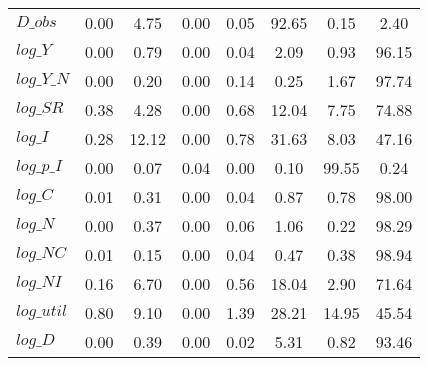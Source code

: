 \begin{center}
\begin{longtable}{lccccccc}
$D\_obs     $	 & 	        0.00	 & 	        4.75	 & 	        0.00	 & 	        0.05	 & 	       92.65	 & 	        0.15	 & 	        2.40 \\ 
$log\_Y     $	 & 	        0.00	 & 	        0.79	 & 	        0.00	 & 	        0.04	 & 	        2.09	 & 	        0.93	 & 	       96.15 \\ 
$log\_Y\_N  $	 & 	        0.00	 & 	        0.20	 & 	        0.00	 & 	        0.14	 & 	        0.25	 & 	        1.67	 & 	       97.74 \\ 
$log\_SR    $	 & 	        0.38	 & 	        4.28	 & 	        0.00	 & 	        0.68	 & 	       12.04	 & 	        7.75	 & 	       74.88 \\ 
$log\_I     $	 & 	        0.28	 & 	       12.12	 & 	        0.00	 & 	        0.78	 & 	       31.63	 & 	        8.03	 & 	       47.16 \\ 
$log\_p\_I  $	 & 	        0.00	 & 	        0.07	 & 	        0.04	 & 	        0.00	 & 	        0.10	 & 	       99.55	 & 	        0.24 \\ 
$log\_C     $	 & 	        0.01	 & 	        0.31	 & 	        0.00	 & 	        0.04	 & 	        0.87	 & 	        0.78	 & 	       98.00 \\ 
$log\_N     $	 & 	        0.00	 & 	        0.37	 & 	        0.00	 & 	        0.06	 & 	        1.06	 & 	        0.22	 & 	       98.29 \\ 
$log\_NC    $	 & 	        0.01	 & 	        0.15	 & 	        0.00	 & 	        0.04	 & 	        0.47	 & 	        0.38	 & 	       98.94 \\ 
$log\_NI    $	 & 	        0.16	 & 	        6.70	 & 	        0.00	 & 	        0.56	 & 	       18.04	 & 	        2.90	 & 	       71.64 \\ 
$log\_util  $	 & 	        0.80	 & 	        9.10	 & 	        0.00	 & 	        1.39	 & 	       28.21	 & 	       14.95	 & 	       45.54 \\ 
$log\_D     $	 & 	        0.00	 & 	        0.39	 & 	        0.00	 & 	        0.02	 & 	        5.31	 & 	        0.82	 & 	       93.46 \\ 
\end{longtable}
 \end{center}
